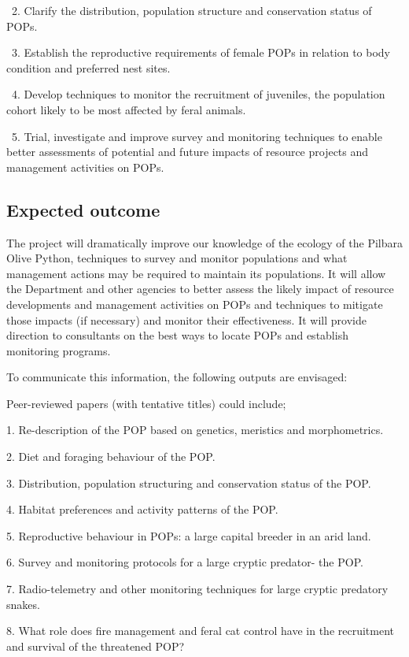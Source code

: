 \documentclass[version=last,
    paper=a4,                               %
    10pt,                                   %
    dvipsnames,
    oneside,                              %
    headings=openany,                       %
    open=any,
    BCOR=7mm,                               %
    DIV=15,     %
]{scrbook}
\begin{document}
~2. Clarify the distribution, population structure and conservation
status of POPs.

~3. Establish the reproductive requirements of female POPs in relation
to body condition and preferred nest sites.

~4. Develop techniques to monitor the recruitment of juveniles, the
population cohort likely to be most affected by feral animals.~

~5. Trial, investigate and improve survey and monitoring techniques to
enable better assessments of potential and future impacts of resource
projects and management activities on POPs.~




\subsection*{Expected outcome}

The project will dramatically improve our knowledge of the ecology of
the Pilbara Olive Python, techniques to survey and monitor populations
and what management actions may be required to maintain its populations.
It will allow the Department and other agencies to better assess the
likely impact of resource developments and management activities on POPs
and techniques to mitigate those impacts (if necessary) and monitor
their effectiveness. It will provide direction to consultants on the
best ways to locate POPs and establish monitoring programs.

To communicate this information, the following outputs are envisaged:

Peer-reviewed papers (with tentative titles) could include;

1. Re-description of the POP based on genetics, meristics and
morphometrics.

2. Diet and foraging behaviour of the POP.

3. Distribution, population structuring and conservation status of the
POP.

4. Habitat preferences and activity patterns of the POP.

5. Reproductive behaviour in POPs: a large capital breeder in an arid
land.

6. Survey and monitoring protocols for a large cryptic predator- the
POP.

7. Radio-telemetry and other monitoring techniques for large cryptic
predatory snakes.~

8. What role does fire management and feral cat control have in the
recruitment and survival of the threatened POP?
\end{document}
